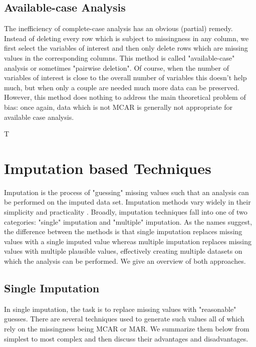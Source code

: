 \documentclass[12pt,twoside]{reedthesis}
\theoremstyle{definition}
\begin{document}
\subsection{Available-case Analysis}

The inefficiency of complete-case analysis has an obvious (partial) remedy. Instead of deleting every row which is subject to missingness in any column, we first select the variables of interest and then only delete rows which are missing values in the corresponding columns. This method is called "available-case" analysis or sometimes "pairwise deletion". Of course, when the number of variables of interest is close to the overall number of variables this doesn't help much, but when only a couple are needed much more data can be preserved. However, this method does nothing to address the main theoretical problem of bias: once again, data which is not MCAR is generally not appropriate for available case analysis.

T

\section{Imputation based Techniques} 

Imputation is the process of "guessing" missing values such that an analysis can be performed on the imputed data set. Imputation methods vary widely in their simplicity and practicality \citep{Schafer_2002}. Broadly, imputation techniques fall into one of two categories: "single" imputation and "multiple" imputation. As the names suggest, the difference between the methods is that single imputation replaces missing values with a single imputed value whereas multiple imputation replaces missing values with multiple plausible values, effectively creating multiple datasets on which the analysis can be performed. We give an overview of both approaches.

\subsection{Single Imputation}
In single imputation, the task is to replace missing values with "reasonable" guesses. There are several techniques used to generate such values all of which rely on the missingness being MCAR or MAR. We summarize them below from simplest to most complex and then discuss their advantages and disadvantages. 
\end{document}
